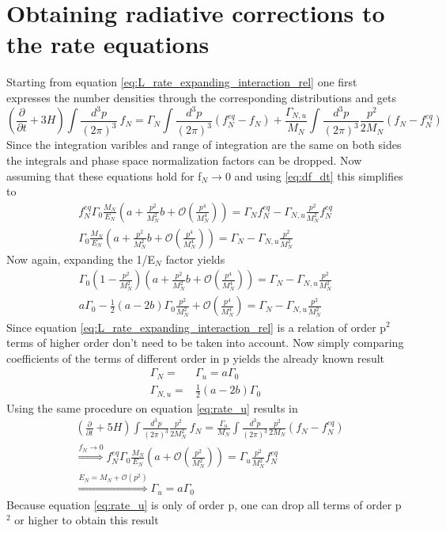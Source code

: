 \section{Obtaining radiative corrections to the rate equations}
\label{ap:rad_corrections}
Starting from equation \ref{eq:L_rate_expanding_interaction_rel} one first expresses the number densities through the corresponding distributions and gets
\begin{equation*}
	\left(\frac{\partial}{\partial t}+3H\right)\int\frac{d^3p}{\left(2\pi\right)^3}\:f_N=\Gamma_N\int\frac{d^3p}{\left(2\pi\right)^3}\left(f_N^{eq}-f_N\right)+\frac{\Gamma_{N,u}}{M_N}\int\frac{d^3p}{\left(2\pi\right)^3}\frac{p^2}{2M_N}\left(f_N-f_N^{eq}\right)
\end{equation*}
Since the integration varibles and range of integration are the same on both sides the integrals and phase space normalization factors can be dropped. Now assuming that these equations hold for f$_N\rightarrow0$ and using \ref{eq:df_dt} this simplifies to 
\begin{align*}
	f_N^{eq}\Gamma_0\frac{M_N}{E_N}\left(a+\frac{p^2}{M_N^2}b+\mathcal{O}\left(\frac{p^4}{M_N^4}\right)\right)=\Gamma_Nf_N^{eq}-\Gamma_{N,u}\frac{p^2}{M_N^2}f_N^{eq}\\
	\Gamma_0\frac{M_N}{E_N}\left(a+\frac{p^2}{M_N^2}b+\mathcal{O}\left(\frac{p^4}{M_N^4}\right)\right)=\Gamma_N-\Gamma_{N,u}\frac{p^2}{M_N^2}
\end{align*}
Now again, expanding the 1/E$_N$ factor yields
\begin{align*}
	\Gamma_0\left(1-\frac{p^2}{M_N^2}\right)\left(a+\frac{p^2}{M_N^2}b+\mathcal{O}\left(\frac{p^4}{M_N^4}\right)\right)=\Gamma_N-\Gamma_{N,u}\frac{p^2}{M_N^2}\\
	a\Gamma_0-\frac{1}{2}(a-2b)\Gamma_0\frac{p^2}{M_N^2}+\mathcal{O}\left(\frac{p^4}{M_N^4}\right)=\Gamma_N-\Gamma_{N,u}\frac{p^2}{M_N^2}
\end{align*}
Since equation \ref{eq:L_rate_expanding_interaction_rel} is a relation of order p$^2$ terms of higher order don't need to be taken into account. \newline
Now simply comparing coefficients of the terms of different order in p yields the already known result
\begin{align*}
\Gamma_N=&\Gamma_u=a\Gamma_0\\
\Gamma_{N,u}=&\frac{1}{2}(a-2b)\Gamma_0
\end{align*}
Using the same procedure on equation \ref{eq:rate_u} results in 
\begin{align*}
&\left(\frac{\partial}{\partial t}+5H\right)\int\frac{d^3p}{\left(2\pi\right)^3}\frac{p^2}{2M_N^2}\:f_N=\frac{\Gamma_{u}}{M_N}\int\frac{d^3p}{\left(2\pi\right)^3}\frac{p^2}{2M_N}\left(f_N-f_N^{eq}\right)\\
&\overset{f_N\rightarrow0}{\Longrightarrow}f_N^{eq}\Gamma_0\frac{M_N}{E_N}\left(a+\mathcal{O}\left(\frac{p^2}{M_N^2}\right)\right)=\Gamma_{u}\frac{p^2}{M_N^2}f_N^{eq}\\
&\overset{E_N=M_N+\mathcal{O}(p^2)}{\Longrightarrow}\Gamma_u=a\Gamma_0
\end{align*}
Because equation \ref{eq:rate_u} is only of order p, one can drop all terms of order p$^2$ or higher to obtain this result